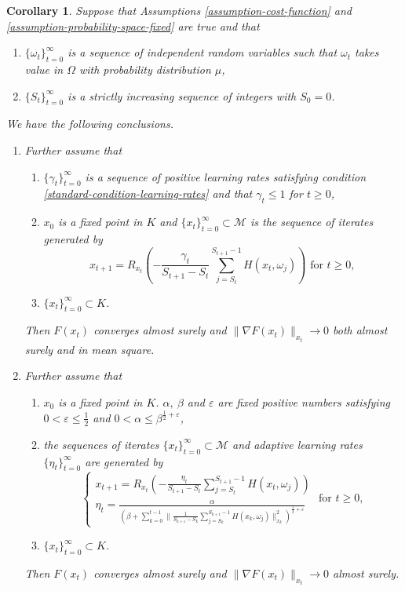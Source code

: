 \documentclass{amsart}
\newcommand{\ve}{\varepsilon}
\newcommand{\M}{\mathcal{M}}
\newcommand{\g}{\gamma}
\theoremstyle{plain}
\newtheorem{corollary}[theorem]{Corollary}
\theoremstyle{definition}
\theoremstyle{remark}
\numberwithin{theorem}{section}
\numberwithin{equation}{section}
\begin{document}
\begin{corollary}\label{cor-batch-with-repetitions}
Suppose that Assumptions \ref{assumption-cost-function} and \ref{assumption-probability-space-fixed} are true and that 
\begin{enumerate}
  \item $\{\omega_t\}_{t=0}^\infty$ is a sequence of independent random variables such that $\omega_t$ takes value in $\Omega$ with probability distribution $\mu$,
	\item $\{S_t\}_{t=0}^\infty$ is a strictly increasing sequence of integers with $S_0 =0$.
\end{enumerate}
We have the following conclusions.
\begin{enumerate}[1.]
	\item Further assume that
\begin{enumerate}
	\item $\{\g_t\}_{t=0}^\infty$ is a sequence of positive learning rates satisfying condition \eqref{standard-condition-learning-rates} and that $\g_t\leq 1$ for $t\geq 0$,
	\item $x_0$ is a fixed point in $K$ and $\{x_t\}_{t=0}^\infty \subset \M$ is the sequence of iterates generated by
	\begin{equation}\label{eq-SGD-update-batch-size-varying-deterministic-learning-rate}
	x_{t+1} = R_{x_t}\left(-\frac{\g_t}{S_{t+1}-S_t}\sum_{j=S_t}^{S_{t+1}-1} H(x_t,\omega_j)\right) \text{ for } t \geq 0, 
	\end{equation}
	\item $\{x_t\}_{t=0}^\infty \subset K$.
\end{enumerate}
Then $F(x_t)$ converges almost surely and $\|\nabla F(x_t)\|_{x_t} \rightarrow 0$ both almost surely and in mean square.
  \item Further assume that
\begin{enumerate}
	\item $x_0$ is a fixed point in $K$. $\alpha,~\beta$ and $\ve$ are fixed positive numbers satisfying  $0 < \ve \leq \frac{1}{2}$ and $ 0<\alpha \leq \beta^{\frac{1}{2}+\ve}$,
	\item the sequences of iterates $\{x_t\}_{t=0}^\infty \subset \M$ and adaptive learning rates $\{\eta_t\}_{t=0}^\infty$ are  generated by
	\begin{equation}\label{eq-SGD-update-batch-varying-adaptive-learning-rate}
	\begin{cases}
	x_{t+1} = R_{x_t}\left(-\frac{\eta_t}{S_{t+1}-S_t}\sum_{j=S_t}^{S_{t+1}-1} H(x_t,\omega_j)\right) \\
	\eta_t = \frac{\alpha}{(\beta + \sum_{k=0}^{t-1}\|\frac{1}{S_{k+1}-S_k}\sum_{j=S_k}^{S_{k+1}-1} H(x_k,\omega_j)\|_{x_k}^2)^{\frac{1}{2}+\ve}}
	\end{cases}\text{ for } t \geq 0, 
	\end{equation}
	\item $\{x_t\}_{t=0}^\infty \subset K$.
\end{enumerate}
Then $F(x_t)$ converges almost surely and $\|\nabla F(x_t)\|_{x_t} \rightarrow 0$ almost surely. 
\end{enumerate}
\end{corollary}
\end{document}
